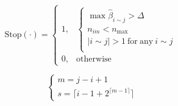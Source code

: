 \documentclass{article}
\begin{document}
\begin{equation}\label{eq:stop}
 \mathrm{Stop}(\cdot) = 
 \left\{
  \begin{array}{ll}
   1, &
   \left\{
    \begin{array}{l}
     \max \hat{\beta}_{i \sim j} > \Delta \\
     n_{im} < n_{\max} \\
     |i\sim j| > 1\ \mathrm{for\ any}\ i\sim j \\
    \end{array}
   \right.\\
   0, & \mathrm{otherwise}
  \end{array}
 \right.
\end{equation}

\begin{equation}\label{eq:s}
 \left\{
  \begin{array}{l}
   m = j-i+1\\
   s =  \lceil i - 1 + 2^{ \lceil m-1 \rceil  } \rceil 
  \end{array}
 \right.
\end{equation}
\end{document}
